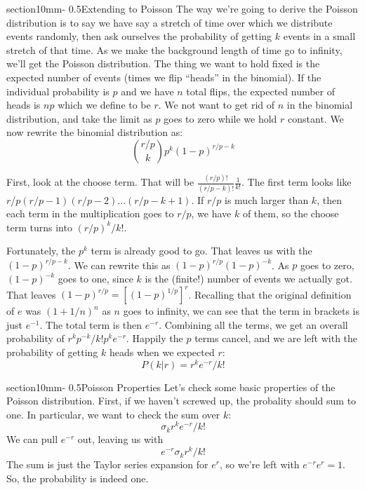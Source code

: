 \documentclass[letterpaper,11pt,preprint]{aastex}
\makeatletter
\renewcommand{\section}{\@startsection%
  {section}{1}{0mm}{-\baselineskip}%
  {0.5\baselineskip}{\normalfont\Large\bfseries}}%
\makeatother
\begin{document}
\section{Extending to Poisson}
The way we're going to derive the Poisson distribution is to say we
have say a stretch of time over which we distribute events randomly,
then ask ourselves the probability of getting $k$ events in a small
stretch of that time.  As we make the background length of time go to
infinity, we'll get the Poisson distribution.  The thing we want to
hold fixed is the expected number of events (times we flip ``heads''
in the binomial).  If the individual probability is $p$ and we have
$n$ total flips, the expected number of heads is $np$ which we define
to be $r$.  We not want to get rid of $n$ in the binomial
distribution, and take the limit as $p$ goes to zero while we hold $r$
constant.  We now rewrite the binomial distribution as:
$${r/p \choose k}p^k(1-p)^{r/p-k}$$

First, look at the choose term.  That will be
$\frac{(r/p)!}{(r/p-k)!}\frac{1}{k!}$.  The first term looks like
$r/p(r/p-1)(r/p-2)...(r/p-k+1)$.  If $r/p$ is much larger than $k$,
then each term in the multiplication goes to $r/p$, we have $k$ of
them, so the choose term turns into $(r/p)^k/k!$.

Fortunately, the $p^k$ term is already good to go.  That leaves us
with the $(1-p)^{r/p-k}$.  We can rewrite this as
$(1-p)^{r/p}(1-p)^{-k}$.  As $p$ goes to zero, $(1-p)^{-k}$ goes to
one, since $k$ is the (finite!) number of events we actually got.
That leaves $(1-p)^{r/p} = \left [ (1-p)^{1/p} \right ]^r$.  Recalling
that the original definition of $e$ was $(1+1/n)^n$ as $n$ goes to
infinity, we can see that the term in brackets is just $e^{-1}$.  The
total term is then $e^{-r}$.  Combining all the terms, we get an
overall probability of $r^kp^{-k}/k!p^ke^{-r}$.  Happily the $p$ terms
cancel, and we are left with the probability of getting $k$ heads when
we expected $r$:
$$P(k|r)=r^ke^{-r}/k!$$

\section{Poisson Properties}
Let's check some basic properties of the Poisson distribution.  First,
if we haven't screwed up, the probality should sum to one.  In
particular, we want to check the sum over $k$:
$$\sigma_k r^ke^{-r}/k!$$
We can pull $e^{-r}$ out, leaving us with
$$e^{-r}\sigma_k r^k/k!$$
The sum is just the Taylor series expansion for $e^{r}$, so we're left
with $e^{-r}e^r=1$.  So, the probability is indeed one.
\end{document}

